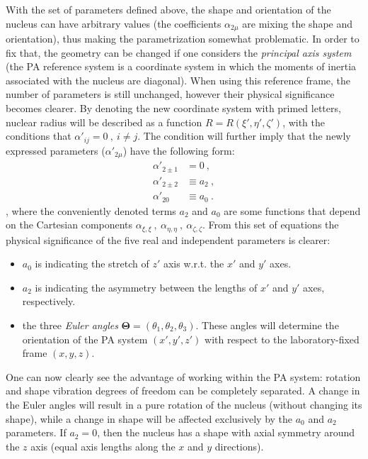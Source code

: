 With the set of parameters defined above, the shape and orientation of the nucleus can have arbitrary values (the coefficients $\alpha_{2\mu}$ are mixing the shape and orientation), thus making the parametrization somewhat problematic. In order to fix that, the geometry can be changed if one considers the \emph{principal axis system} (the PA reference system is a coordinate system in which the moments of inertia associated with the nucleus are diagonal). 
When using this reference frame, the number of parameters is still unchanged, however their physical significance becomes clearer. By denoting the new coordinate system with primed letters, nuclear radius will be described as a function $R=R(\xi',\eta',\zeta')$, with the conditions that $\alpha'_{ij}=0\ ,\ i\neq j$. The condition will further imply that the newly expressed parameters ($\alpha'_{2\mu}$) have the following form:
\begin{align}
    \alpha'_{2 \pm 1}&=0\ , \nonumber \\
    \alpha'_{2 \pm 2}&\equiv a_2\ , \nonumber \\
    \alpha'_{20}&\equiv a_0\ . 
\end{align}
, where the conveniently denoted terms $a_2$ and $a_0$ are some functions that depend on the Cartesian components $\alpha_{\xi,\xi}\ ,\ \alpha_{\eta,\eta}\ ,\ \alpha_{\zeta,\zeta}$. From this set of equations the physical significance of the five real and independent parameters is clearer:
\begin{itemize}
    \item $a_0$ is indicating the stretch of $z'$ axis w.r.t. the $x'$ and $y'$ axes.
    \item $a_2$ is indicating the asymmetry between the lengths of $x'$ and $y'$ axes, respectively.
    \item the three \emph{Euler angles} $\mathbf{\Theta}=(\theta_1,\theta_2,\theta_3)$. These angles will determine the orientation of the PA system $(x',y',z')$ with respect to the laboratory-fixed frame $(x,y,z)$.
\end{itemize}

One can now clearly see the advantage of working within the PA system: rotation and shape vibration degrees of freedom can be completely separated. A change in the Euler angles will result in a pure rotation of the nucleus (without changing its shape), while a change in shape will be affected exclusively by the $a_0$ and $a_2$ parameters. If $a_2=0$, then the nucleus has a shape with axial symmetry around the $z$ axis (equal axis lengths along the $x$ and $y$ directions).

